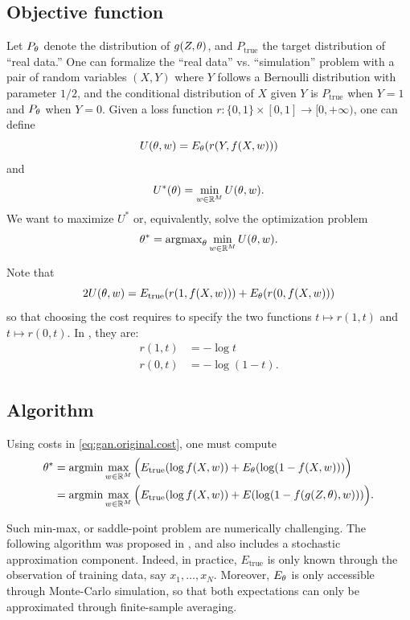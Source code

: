 \subsection{Objective function}
 Let $P_\theta$ denote the distribution of $g(Z, \theta)$, and $P_{\mathrm{true}}$ the target distribution of ``real data.'' 
One can formalize the ``real data'' vs. ``simulation'' problem with a  pair of random variables $(X, Y)$ where $Y$ follows a Bernoulli distribution with parameter $1/2$, and the conditional distribution of $X$ given $Y$ is $P_{\mathrm{true}}$ when $Y=1$ and $P_\theta$ when $Y=0$. 
 Given a loss function $r: \{0,1\} \times [0,1] \to [0, +\infty)$, one can define 
\[
U(\theta, w) = E_\theta(r(Y, f(X, w)))
\]
and 
\[
U^*(\theta) = \min_{w\in {\mathbb{R}}^M} U(\theta, w).
\]
 We want to maximize $U^*$ or, equivalently,  solve the optimization problem
\[
\theta^* = \mathrm{argmax}_\theta \min_{w\in {\mathbb{R}}^M} U(\theta, w).
\]

Note that
\[
2 U(\theta, w) = E_{\mathrm{true}}(r(1, f(X, w))) + E_{\theta}(r(0, f(X, w)))
\]
so that choosing the cost requires to specify the two functions $t\mapsto r(1, t)$ and $t\mapsto r(0, t)$. 
 In \citet{goodfellow2014generative}, they are:
\begin{equation}
\label{eq:gan.original.cost}
\begin{aligned}
r(1,t) &=  -\log t\\
r(0,t) & = -\log (1-t).
\end{aligned}
\end{equation}

\subsection{Algorithm}
Using costs in \cref{eq:gan.original.cost}, one must compute
\[
\begin{aligned}
\theta^* &= \mathrm{argmin} \max_{w\in {\mathbb{R}}^M} \Big(E_{\mathrm{true}}(\log f(X, w)) + E_{\theta}(\log(1-f(X, w)))\Big)\\
 &= \mathrm{argmin} \max_{w\in {\mathbb{R}}^M} \Big(E_{\mathrm{true}}(\log f(X, w)) + E(\log(1-f(g(Z, \theta), w)))\Big).
 \end{aligned}
\]

Such min-max, or saddle-point problem are numerically challenging. The following algorithm was proposed in \citet{goodfellow2014generative}, and also includes a stochastic approximation component. Indeed,  in practice, $E_{\mathrm{true}}$ is only known through the observation of training data, say $x_1, \ldots, x_N$. Moreover, 
 $E_\theta$ is only accessible through Monte-Carlo simulation, so that both  expectations can only be approximated through finite-sample averaging. 


